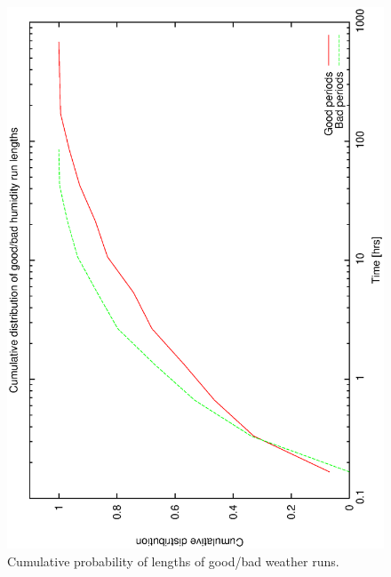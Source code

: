 {\begin{figure}[htbp] 
\begin{center}
    \includegraphics[scale=0.4, angle=-90]{figures/ecs/good_bad_cumhum_bin.eps}
\end{center}
\caption[Cumulative probability of lengths of good/bad weather runs.]
{Cumulative probability of lengths of good/bad weather runs.}
\label{fig:good_bad_cumhum_dist}
\end{figure}

}
